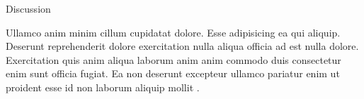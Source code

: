 Discussion

Ullamco anim minim cillum cupidatat dolore. Esse adipisicing ea qui aliquip. Deserunt reprehenderit dolore exercitation nulla aliqua officia ad est nulla dolore. Exercitation quis anim aliqua laborum anim anim commodo duis consectetur enim sunt officia fugiat. Ea non deserunt excepteur ullamco pariatur enim ut proident esse id non laborum aliquip mollit \parencite{einstein}.

